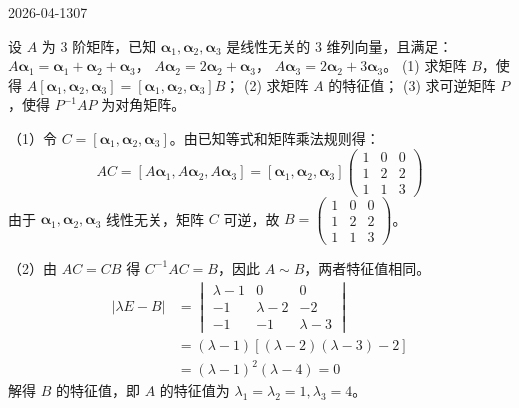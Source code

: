 \begin{mistake}{2026-04-13}{07}

\begin{problemcontent}
设 \(A\) 为 3 阶矩阵，已知 \(\boldsymbol{\alpha}_1, \boldsymbol{\alpha}_2, \boldsymbol{\alpha}_3\) 是线性无关的 3 维列向量，且满足：
\(A\boldsymbol{\alpha}_1 = \boldsymbol{\alpha}_1 + \boldsymbol{\alpha}_2 + \boldsymbol{\alpha}_3\)，
\(A\boldsymbol{\alpha}_2 = 2\boldsymbol{\alpha}_2 + \boldsymbol{\alpha}_3\)，
\(A\boldsymbol{\alpha}_3 = 2\boldsymbol{\alpha}_2 + 3\boldsymbol{\alpha}_3\)。
(1) 求矩阵 \(B\)，使得 \(A[\boldsymbol{\alpha}_1, \boldsymbol{\alpha}_2, \boldsymbol{\alpha}_3] = [\boldsymbol{\alpha}_1, \boldsymbol{\alpha}_2, \boldsymbol{\alpha}_3]B\)；
(2) 求矩阵 \(A\) 的特征值；
(3) 求可逆矩阵 \(P\)，使得 \(P^{-1}AP\) 为对角矩阵。
\end{problemcontent}

\begin{solutioncontent}
（1）令 \(C = [\boldsymbol{\alpha}_1, \boldsymbol{\alpha}_2, \boldsymbol{\alpha}_3]\)。由已知等式和矩阵乘法规则得：
\[
AC = [A\boldsymbol{\alpha}_1, A\boldsymbol{\alpha}_2, A\boldsymbol{\alpha}_3] = [\boldsymbol{\alpha}_1, \boldsymbol{\alpha}_2, \boldsymbol{\alpha}_3]
\begin{pmatrix}
1 & 0 & 0 \\
1 & 2 & 2 \\
1 & 1 & 3
\end{pmatrix}
\]
由于 \(\boldsymbol{\alpha}_1, \boldsymbol{\alpha}_2, \boldsymbol{\alpha}_3\) 线性无关，矩阵 \(C\) 可逆，故
\(B = \begin{pmatrix} 1 & 0 & 0 \\ 1 & 2 & 2 \\ 1 & 1 & 3 \end{pmatrix}\)。

（2）由 \(AC = CB\) 得 \(C^{-1}AC = B\)，因此 \(A \sim B\)，两者特征值相同。
\[
\begin{aligned}
|\lambda E - B| &= \begin{vmatrix}
\lambda - 1 & 0 & 0 \\
-1 & \lambda - 2 & -2 \\
-1 & -1 & \lambda - 3
\end{vmatrix} \\
&= (\lambda - 1)[(\lambda - 2)(\lambda - 3) - 2] \\
&= (\lambda - 1)^2(\lambda - 4) = 0
\end{aligned}
\]
解得 \(B\) 的特征值，即 \(A\) 的特征值为 \(\lambda_1 = \lambda_2 = 1, \lambda_3 = 4\)。


\end{solutioncontent}
\end{mistake}
